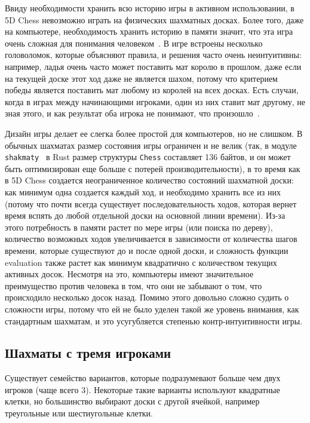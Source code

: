 \documentclass{article}
\begin{document}
Ввиду необходимости хранить всю историю игры в активном использовании,
в 5D Chess невозможно играть на физических шахматных досках.
Более того, даже на компьютере, необходимость хранить историю в памяти
значит, что эта игра очень сложная для понимания человеком~\cite{5dchess-review}.
В игре встроены несколько головоломок, которые объясняют правила,
и решения часто очень неинтуитивны:
например, ладья очень часто может поставить мат королю в прошлом,
даже если на текущей доске этот ход даже не является шахом,
потому что критерием победы является поставить мат любому из королей на всех досках.
Есть случаи, когда в играх между начинающими игроками,
один из них ставит мат другому, не зная этого,
и как результат оба игрока не понимают, что произошло~\cite{5dchess-rtgame}.

Дизайн игры делает ее слегка более простой для компьютеров, но не слишком.
В обычных шахматах размер состояния игры ограничен и не велик
(так, в модуле \texttt{shakmaty}~\cite{shakmaty-crate} в Rust размер структуры \texttt{Chess} составляет 136 байтов,
и он может быть оптимизирован еще больше с потерей производительности),
в то время как в 5D Chess создается неограниченное количество состояний шахматной доски:
как минимум одна создается каждый ход,
и необходимо хранить все из них
(потому что почти всегда существует последовательность ходов,
которая вернет время вспять до любой отдельной доски на основной линии времени).
Из-за этого потребность в памяти растет по мере игры (или поиска по дереву),
количество возможных ходов увеличивается в зависимости от количества шагов времени, которые существуют до и после одной доски,
и сложность функции evaluation также растет как минимум квадратично с количеством текущих активных досок.
Несмотря на это, компьютеры имеют значительное преимущество против человека в том,
что они не забывают о том, что происходило несколько досок назад.
Помимо этого довольно сложно судить о сложности игры,
потому что ей не было уделен такой же уровень внимания, как стандартным шахматам,
и это усугубляется степенью контр-интуитивности игры. 

\subsection{Шахматы с тремя игроками}

Существует семейство вариантов,
которые подразумевают больше чем двух игроков
(чаще всего 3).
Некоторые такие варианты используют квадратные клетки,
но большинство выбирают доски с другой ячейкой,
например треугольные или шестиугольные клетки.
\end{document}
